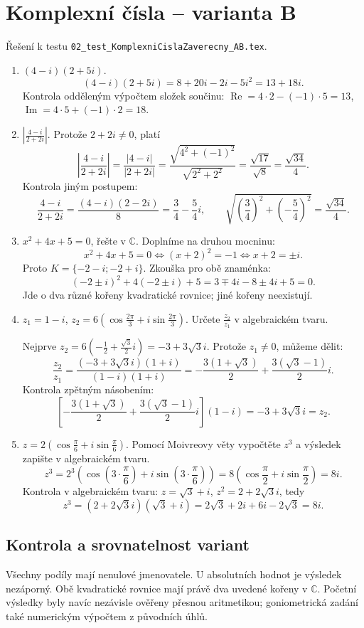 \documentclass[a4paper,10pt]{article}
\begin{document}
\section*{Komplexní čísla -- varianta B}
Řešení k testu \texttt{02\_test\_KomplexniCislaZaverecny\_AB.tex}.
\begin{enumerate}
\item \((4-i)(2+5i)\).
\[
(4-i)(2+5i)=8+20i-2i-5i^2=13+18i.
\]
Kontrola odděleným výpočtem složek součinu:
$\operatorname{Re}=4\cdot2-(-1)\cdot5=13$,
$\operatorname{Im}=4\cdot5+(-1)\cdot2=18$.

\item \(\left|\frac{4-i}{2+2i}\right|\).
Protože $2+2i\neq0$, platí
\[
\left|\frac{4-i}{2+2i}\right|
=\frac{|4-i|}{|2+2i|}
=\frac{\sqrt{4^2+(-1)^2}}{\sqrt{2^2+2^2}}
=\frac{\sqrt{17}}{\sqrt8}=\frac{\sqrt{34}}4.
\]
Kontrola jiným postupem:
\[
\frac{4-i}{2+2i}=\frac{(4-i)(2-2i)}8=\frac34-\frac54i,
\qquad
\sqrt{\left(\frac34\right)^2+\left(-\frac54\right)^2}=\frac{\sqrt{34}}4.
\]

\item \(x^2+4x+5=0\), řešte v \(\mathbb C\).
Doplníme na druhou mocninu:
\[
x^2+4x+5=0 \iff (x+2)^2=-1 \iff x+2=\pm i.
\]
Proto $K=\{-2-i;-2+i\}$.
Zkouška pro obě znaménka:
\[
(-2\pm i)^2+4(-2\pm i)+5
=3\mp4i-8\pm4i+5=0.
\]
Jde o dva různé kořeny kvadratické rovnice; jiné kořeny neexistují.

\item \(z_1=1-i\),
\(z_2=6\left(\cos\frac{2\pi}{3}+i\sin\frac{2\pi}{3}\right)\).
Určete \(\frac{z_2}{z_1}\) v algebraickém tvaru.

Nejprve $z_2=6(-\frac12+\frac{\sqrt3}{2}i)=-3+3\sqrt3i$.
Protože $z_1\neq0$, můžeme dělit:
\[
\frac{z_2}{z_1}
=\frac{(-3+3\sqrt3i)(1+i)}{(1-i)(1+i)}
=-\frac{3(1+\sqrt3)}2+\frac{3(\sqrt3-1)}2i.
\]
Kontrola zpětným násobením:
\[
\left[-\frac{3(1+\sqrt3)}2+\frac{3(\sqrt3-1)}2i\right](1-i)
=-3+3\sqrt3i=z_2.
\]

\item \(z=2\left(\cos\frac{\pi}{6}+i\sin\frac{\pi}{6}\right)\).
Pomocí Moivreovy věty vypočtěte \(z^3\) a výsledek zapište v algebraickém tvaru.
\[
z^3=2^3\left(\cos\left(3\cdot\frac{\pi}{6}\right)
+i\sin\left(3\cdot\frac{\pi}{6}\right)\right)
=8\left(\cos\frac\pi2+i\sin\frac\pi2\right)=8i.
\]
Kontrola v algebraickém tvaru: $z=\sqrt3+i$, $z^2=2+2\sqrt3i$, tedy
\[
z^3=(2+2\sqrt3i)(\sqrt3+i)
=2\sqrt3+2i+6i-2\sqrt3=8i.
\]
\end{enumerate}

\subsection*{Kontrola a srovnatelnost variant}
Všechny podíly mají nenulové jmenovatele. U absolutních hodnot je výsledek
nezáporný. Obě kvadratické rovnice mají právě dva uvedené kořeny v $\mathbb C$.
Početní výsledky byly navíc nezávisle ověřeny přesnou aritmetikou;
goniometrická zadání také numerickým výpočtem z původních úhlů.
\end{document}
